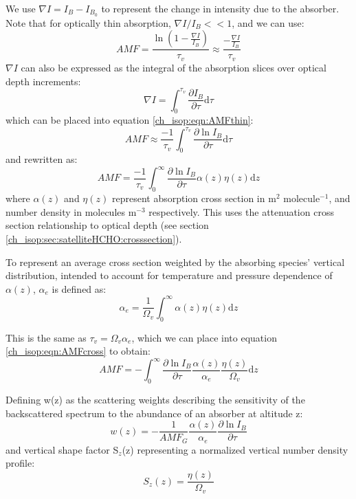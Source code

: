     We use $\nabla I = I_B - I_{B_0}$ to represent the change in intensity due to the absorber. Note that for optically thin absorption, $\nabla I / I_B << 1$, and we can use:
    \begin{equation} \label{ch_isop:eqn:AMFthin}
      AMF = \frac{\ln{ \left( 1 - \frac{\nabla I}{I_B} \right)} }{\tau_v} \approx \frac{ - \frac{\nabla I}{I_B} }{\tau_v}
    \end{equation}
    $\nabla I$ can also be expressed as the integral of the absorption slices over optical depth increments: 
    \begin{equation*}
      \nabla I = \int_0^{\tau_v}{\frac{\partial I_B}{\partial \tau} \mathrm{d}\tau}
    \end{equation*}
    which can be placed into equation \ref{ch_isop:eqn:AMFthin}:
    \begin{equation*}
      AMF \approx \frac{-1}{\tau_v} \int_0^{\tau_v}{\frac{\partial \ln{I_B}}{\partial \tau} \mathrm{d}\tau}
    \end{equation*}
    and rewritten as:
    \begin{equation} \label{ch_isop:eqn:AMFcross}
      AMF = \frac{-1}{\tau_v} \int_0^\infty {\frac{\partial \ln{I_B}}{\partial \tau} \alpha(z)\eta(z)\mathrm{d}z}
    \end{equation}
    where $\alpha(z)$ and $\eta(z)$ represent absorption cross section in m$^2$ molecule$^{-1}$, and number density in molecules m$^{-3}$ respectively. This uses the attenuation cross section relationship to optical depth (see section \ref{ch_isop:sec:satelliteHCHO:crosssection}).

    To represent an average cross section weighted by the absorbing species' vertical distribution, intended to account for temperature and pressure dependence of $\alpha(z)$, $\alpha_e$ is defined as:
    \begin{equation*}
      \alpha_e = \frac{1}{\Omega_v} \int_0^\infty \alpha(z) \eta(z) \mathrm{d}z
    \end{equation*}

    This is the same as $ \tau_v = \Omega_v \alpha_e $, which we can place into equation \ref{ch_isop:eqn:AMFcross} to obtain:
    \begin{equation*}
      AMF=-\int_0^\infty{ \frac{\partial \ln{I_B}}{\partial \tau} \frac{\alpha(z)}{\alpha_e} \frac{\eta(z)}{\Omega_v} \mathrm{d}z }
    \end{equation*}

    Defining w(z) as the scattering weights describing the sensitivity of the backscattered spectrum to the abundance of an absorber at altitude z:
    \begin{equation}
      w(z) = -\frac{1}{AMF_G} \frac{\alpha(z)}{\alpha_e} \frac{\partial \ln{I_B}}{\partial \tau}
    \end{equation}
    and vertical shape factor S$_z$(z) representing a normalized vertical number density profile: 
    \begin{equation} \label{ch_isop:eqn:ShapeFactor}
      S_z(z) = \frac{\eta(z)}{\Omega_v}
    \end{equation}
    
